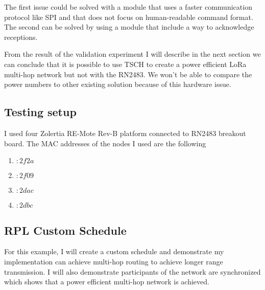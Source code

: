 
The first issue could be solved with a module that uses a faster communication
protocol like SPI and that does not focus on human-readable command format.
The second can be solved by using a module that include a way to acknowledge
receptions.

From the result of the validation experiment I will describe in the next section
we can conclude that it is possible to use TSCH to create a power efficient LoRa
multi-hop network but not with the RN2483.
We won't be able to compare the power numbers to other existing solution
because of this hardware issue.


\subsection{Testing setup}

I used four Zolertia RE-Mote Rev-B platform connected to RN2483 breakout board.
The MAC addresses of the nodes I used are the following

\begin{enumerate}
  \item $:2f2a$
  \item $:2f09$
  \item $:2dac$
  \item $:2dbc$
\end{enumerate}

\subsection{RPL Custom Schedule\label{section:tschrpl}}

For this example, I will create a custom schedule and demonstrate
my implementation can achieve multi-hop routing to achieve longer range
transmission.
I will also demonstrate participants of the network are synchronized which shows
that a power efficient multi-hop network is achieved.

\paragraph{}


